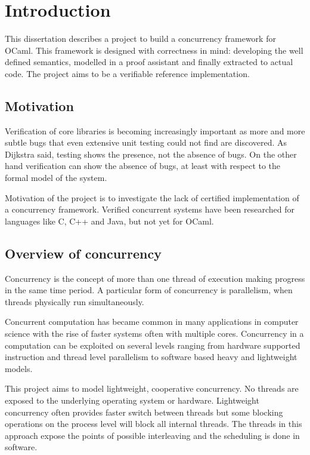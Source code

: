 \documentclass[12pt,twoside,notitlepage]{report}
\theoremstyle{plain}%
\theoremstyle{definition}
\theoremstyle{remark}
\begin{document}
\cleardoublepage        %

\setcounter{page}{1}
\pagestyle{headings}
\chapter{Introduction}

This dissertation describes a project to build a concurrency framework for OCaml. This framework is designed with correctness in mind: developing the well defined semantics, modelled in a proof assistant and finally extracted to actual code. The project aims to be a verifiable reference implementation. 

\section{Motivation}
Verification of core libraries is becoming increasingly important as more and more subtle bugs that even extensive unit testing could not find are discovered. As Dijkstra said, testing shows the presence, not the absence of bugs. On the other hand verification can show the absence of bugs, at least with respect to the formal model of the system.

Motivation of the project is to investigate the lack of certified implementation of a concurrency framework. Verified concurrent systems have been researched for languages like C\cite{sevvcik2011relaxed}, C++ and Java\cite{lochbihler2012machine}, but not yet for OCaml. 

\section{Overview of concurrency}
Concurrency is the concept of more than one thread of execution making progress in the same time period. A particular form of concurrency is parallelism, when threads physically run simultaneously.

Concurrent computation has became common in many applications in computer science with the rise of faster systems often with multiple cores. Concurrency in a computation can be exploited on several levels ranging from hardware supported instruction and thread level parallelism to software based heavy and lightweight models. 

This project aims to model lightweight, cooperative concurrency. No threads are exposed to the underlying operating system or hardware. Lightweight concurrency often provides faster switch between threads  but some blocking operations on the process level will block all internal threads. The threads in this approach expose the points of possible interleaving and the scheduling is done in software.
\end{document}
